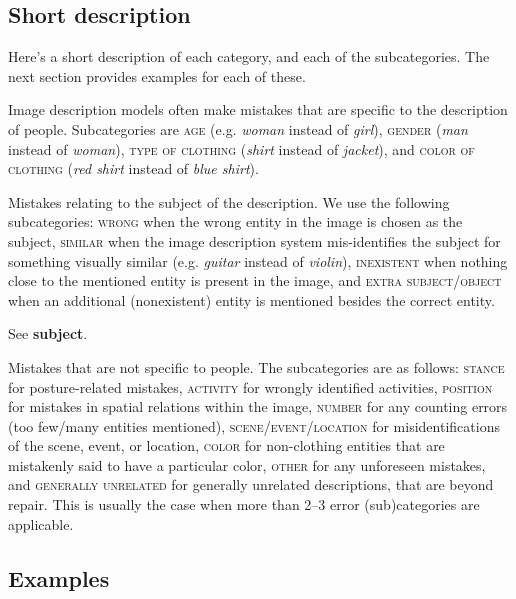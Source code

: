 \documentclass[11pt,a4paper]{article}
\begin{document}
\subsection{Short description}
Here's a short description of each category, and each of the subcategories. The next section provides examples for each of these.
\begin{description}[noitemsep, leftmargin=0cm, topsep=0px, itemindent=1.5\parindent]
\item[People] Image description models often make mistakes that are specific to the description of people. Subcategories are \textsc{age} (e.g. \emph{woman} instead of \emph{girl}), \textsc{gender} (\emph{man} instead of \emph{woman}), \textsc{type of clothing} (\emph{shirt} instead of \emph{jacket}), and \textsc{color of clothing} (\emph{red shirt} instead of \emph{blue shirt}).
\item[Subject] Mistakes relating to the subject of the description. We use the following subcategories: \textsc{wrong} when the wrong entity in the image is chosen as the subject, \textsc{similar} when the image description system mis-identifies the subject for something visually similar (e.g. \emph{guitar} instead of \emph{violin}), \textsc{inexistent} when nothing close to the mentioned entity is present in the image, and \textsc{extra subject/object} when an additional (nonexistent) entity is mentioned besides the correct entity.
\item[Object] See \textbf{subject}.
\item[General] Mistakes that are not specific to people. The subcategories are as follows: \textsc{stance} for posture-related mistakes, \textsc{activity} for wrongly identified activities, \textsc{position} for mistakes in spatial relations within the image, \textsc{number} for any counting errors (too few/many entities mentioned), \textsc{scene/event/location} for misidentifications of the scene, event, or location, \textsc{color} for non-clothing entities that are mistakenly said to have a particular color, \textsc{other} for any unforeseen mistakes, and \textsc{generally unrelated} for generally unrelated descriptions, that are beyond repair. This is usually the case when more than 2--3 error (sub)categories are applicable.
\end{description}

\subsection{Examples}
\end{document}
